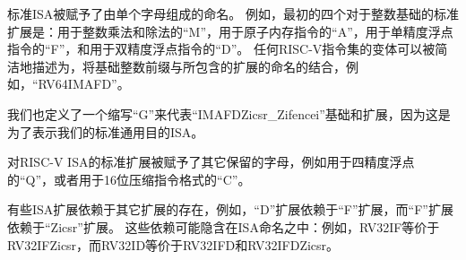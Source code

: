 标准ISA被赋予了由单个字母组成的命名。
例如，最初的四个对于整数基础的标准扩展是：用于整数乘法和除法的“M”，用于原子内存指令的“A”，用于单精度浮点指令的“F”，和用于双精度浮点指令的“D”。
任何RISC-V指令集的变体可以被简洁地描述为，将基础整数前缀与所包含的扩展的命名的结合，例如，“RV64IMAFD”。

我们也定义了一个缩写“G”来代表“IMAFDZicsr\_Zifencei”基础和扩展，因为这是为了表示我们的标准通用目的ISA。

对RISC-V ISA的标准扩展被赋予了其它保留的字母，例如用于四精度浮点的“Q”，或者用于16位压缩指令格式的“C”。

有些ISA扩展依赖于其它扩展的存在，例如，“D”扩展依赖于“F”扩展，而“F”扩展依赖于“Zicsr”扩展。
这些依赖可能隐含在ISA命名之中：例如，RV32IF等价于RV32IFZicsr，而RV32ID等价于RV32IFD和RV32IFDZicsr。

